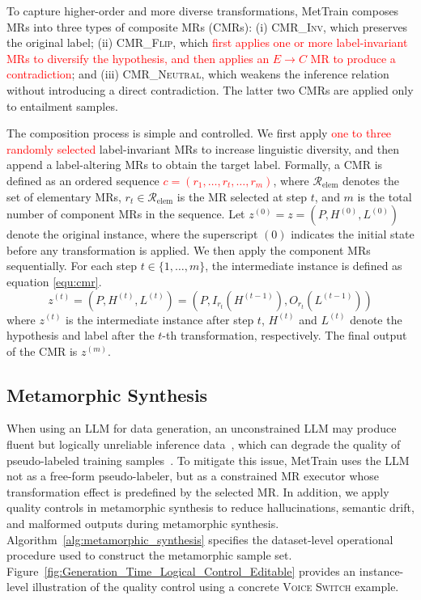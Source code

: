 \documentclass[lettersize,journal]{IEEEtran}
\newcommand{\red}[1]{\textcolor{red}{#1}}
\begin{document}
To capture higher-order and more diverse transformations, MetTrain composes MRs into three types of composite MRs (CMRs): (i) \textsc{CMR\_Inv}, which preserves the original label; (ii) \textsc{CMR\_Flip}, which \red{first applies one or more label-invariant MRs to diversify the hypothesis, and then applies an $E\rightarrow C$ MR to produce a contradiction}; and (iii) \textsc{CMR\_Neutral}, which weakens the inference relation without introducing a direct contradiction. The latter two CMRs are applied only to entailment samples.

The composition process is simple and controlled. We first apply \red{one to three randomly selected} label-invariant MRs to increase linguistic diversity, and then append a label-altering MRs to obtain the target label.
Formally, a CMR is defined as an ordered sequence
\red{$c=(r_1,\dots,r_t,\dots,r_m)$}, where $\mathcal{R}_{\mathrm{elem}}$ denotes the set of elementary MRs, $r_t \in \mathcal{R}_{\mathrm{elem}}$ is the MR selected at step $t$, and $m$ is the total number of component MRs in the sequence. Let $z^{(0)} = z = (P, H^{(0)}, L^{(0)})$ denote the original instance, where the superscript $(0)$ indicates the initial state before any transformation is applied. We then apply the component MRs sequentially. For each step $t \in \{1,\dots,m\}$, the intermediate instance is defined as equation \ref{equ:cmr}.
\begin{equation}
	\label{equ:cmr}
	z^{(t)} = (P,H^{(t)},L^{(t)})
	= (P,I_{r_t}(H^{(t-1)}),O_{r_t}(L^{(t-1)}))
\end{equation}
where $z^{(t)}$ is the intermediate instance after step $t$, $H^{(t)}$ and $L^{(t)}$ denote the hypothesis and label after the $t$-th transformation, respectively. The final output of the CMR is $z^{(m)}$.



\subsection{Metamorphic Synthesis}

When using an LLM for data generation, an unconstrained LLM may produce fluent but logically unreliable inference data~\cite{mckenna-etal-2023-sources}, which can degrade the quality of pseudo-labeled training samples~\cite{DBLP:conf/emnlp/ParkC24}. To mitigate this issue, MetTrain uses the LLM not as a free-form pseudo-labeler, but as a constrained MR executor whose transformation effect is predefined by the selected MR. In addition, we apply quality controls in metamorphic synthesis to reduce hallucinations, semantic drift, and malformed outputs during metamorphic synthesis. Algorithm~\ref{alg:metamorphic_synthesis} specifies the dataset-level operational procedure used to construct the metamorphic sample set. Figure~\ref{fig:Generation_Time_Logical_Control_Editable} provides an instance-level illustration of the quality control using a concrete \textsc{Voice Switch} example. 
\end{document}
